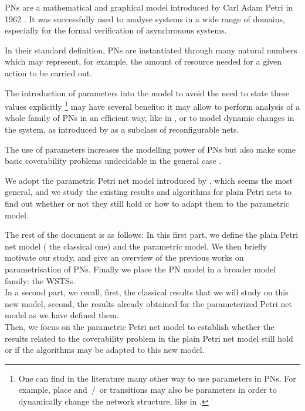 \acp{PN} are a mathematical and graphical model introduced by Carl Adam Petri in 1962 \citep{Petri62,Petri66}. It was successfully used to analyse systems in a wide range of domains, especially for the formal verification of asynchronous systems.

In their standard definition, \acp{PN} are instantiated through many natural numbers which may represent, for example, the amount of resource needed for a given action to be carried out.

The introduction of parameters into the model to avoid the need to state these values explicitly%
\footnote{One can find in the literature many other way to use parameters in \acp{PN}. For example, place and~/~or transitions may also be parameters in order to dynamically change the network structure, like in \cite{Christensen97}.}
may have several benefits:
it may allow to perform analysis of a whole family of \acp{PN} in an efficient way, like in \cite{Abdulla13}, or to model dynamic changes in the system, as introduced by \cite{Badouel99} as a subclass of reconfigurable nets.

The use of parameters increases the modelling power of \acp{PN} but also make some basic coverability problems undecidable in the general case \cite{David17}.

We adopt the parametric Petri net model introduced by \cite{David17}, which seems the most general, and we study the existing results and algorithms for plain Petri nets to find out whether or not they still hold or how to adapt them to the parametric model.

The rest of the document is as follows:
In this first part, we define the plain Petri net model ( the classical one) and the parametric model.
We then briefly motivate our study,  and give an overview of the previous works on parametrisation of \acp{PN}.
Finally we place the \ac{PN} model in a broader model family: the \acp{WSTS}.\\
In a second part, we recall, first, the classical results that we will study on this new model, second, the results already obtained for the parameterized Petri net model as we have defined them.\\
Then, we focus on the parametric Petri net model to establish whether the results related to the coverability problem in the plain Petri net model still hold or if the algorithms may be adapted to this new model.

\acresetall

